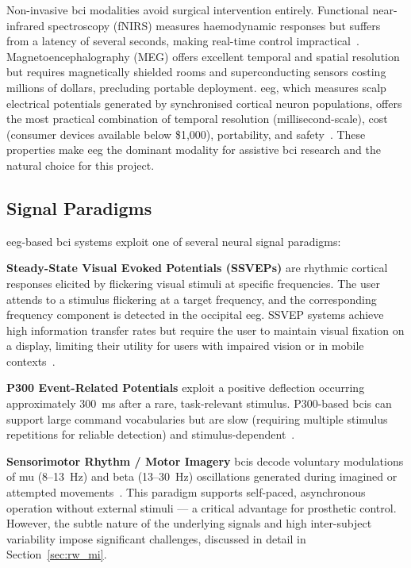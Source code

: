 Non-invasive \acrshort{bci} modalities avoid surgical intervention
entirely. Functional near-infrared spectroscopy (fNIRS) measures
haemodynamic responses but suffers from a latency of several seconds,
making real-time control impractical~\cite{naseer2015fnirs}.
Magnetoencephalography (MEG) offers excellent temporal and spatial
resolution but requires magnetically shielded rooms and
superconducting sensors costing millions of dollars, precluding
portable deployment. \acrfull{eeg}, which measures scalp electrical
potentials generated by synchronised cortical neuron populations,
offers the most practical combination of temporal resolution
(millisecond-scale), cost (consumer devices available below
\$1{,}000), portability, and safety~\cite{lotte2007review}. These
properties make \acrshort{eeg} the dominant modality for assistive
\acrshort{bci} research and the natural choice for this project.

\subsection{Signal Paradigms}

\acrshort{eeg}-based \acrshort{bci} systems exploit one of several
neural signal paradigms:

\textbf{Steady-State Visual Evoked Potentials (SSVEPs)} are rhythmic
cortical responses elicited by flickering visual stimuli at specific
frequencies. The user attends to a stimulus flickering at a target
frequency, and the corresponding frequency component is detected in
the occipital \acrshort{eeg}. SSVEP systems achieve high information
transfer rates but require the user to maintain visual fixation on
a display, limiting their utility for users with impaired vision or
in mobile contexts~\cite{nakanishi2018ssvep}.

\textbf{P300 Event-Related Potentials} exploit a positive deflection
occurring approximately 300~ms after a rare, task-relevant stimulus.
P300-based \acrshort{bci}s can support large command vocabularies
but are slow (requiring multiple stimulus repetitions for reliable
detection) and stimulus-dependent~\cite{donchin2000p300}.

\textbf{Sensorimotor Rhythm / Motor Imagery} \acrshort{bci}s decode
voluntary modulations of mu (8--13~Hz) and beta (13--30~Hz)
oscillations generated during imagined or attempted
movements~\cite{pfurtscheller1999erd}. This paradigm supports
self-paced, asynchronous operation without external stimuli — a
critical advantage for prosthetic control. However, the subtle nature
of the underlying signals and high inter-subject variability impose
significant challenges, discussed in detail in
Section~\ref{sec:rw_mi}.

